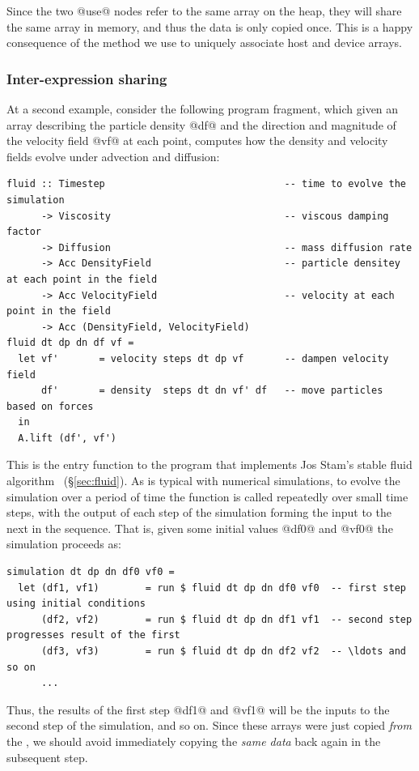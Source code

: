 Since the two @use@ nodes refer to the same array on the heap, they will
share the same array in \GPU memory, and thus the data is only copied once.
This is a happy consequence of the method we use to uniquely associate host and
device arrays.

\subsubsection{Inter-expression sharing}

At a second example, consider the following program fragment, which given an
array describing the particle density @df@ and the direction and magnitude
of the velocity field @vf@ at each point, computes how the density and
velocity fields evolve under advection and diffusion:
%
\begin{lstlisting}[style=haskell]
fluid :: Timestep                               -- time to evolve the simulation
      -> Viscosity                              -- viscous damping factor
      -> Diffusion                              -- mass diffusion rate
      -> Acc DensityField                       -- particle densitey at each point in the field
      -> Acc VelocityField                      -- velocity at each point in the field
      -> Acc (DensityField, VelocityField)
fluid dt dp dn df vf =
  let vf'       = velocity steps dt dp vf       -- dampen velocity field
      df'       = density  steps dt dn vf' df   -- move particles based on forces
  in
  A.lift (df', vf')
\end{lstlisting}
%
This is the entry function to the program that implements Jos Stam's stable
fluid algorithm~\cite{Stam:1999ey} (\S\ref{sec:fluid}). As is typical with
numerical simulations, to evolve the simulation over a period of time the
function is called repeatedly over small time steps, with the output of each
step of the simulation forming the input to the next in the sequence. That is,
given some initial values @df0@ and @vf0@ the simulation proceeds as:
%
\begin{lstlisting}[style=haskell]
simulation dt dp dn df0 vf0 =
  let (df1, vf1)        = run $ fluid dt dp dn df0 vf0  -- first step using initial conditions
      (df2, vf2)        = run $ fluid dt dp dn df1 vf1  -- second step progresses result of the first
      (df3, vf3)        = run $ fluid dt dp dn df2 vf2  -- \ldots and so on
      ...
\end{lstlisting}
%
Thus, the results of the first step @df1@ and @vf1@ will be the inputs
to the second step of the simulation, and so on. Since these arrays were just
copied \emph{from} the \GPU, we should avoid immediately copying the \emph{same
data} back again in the subsequent step.

